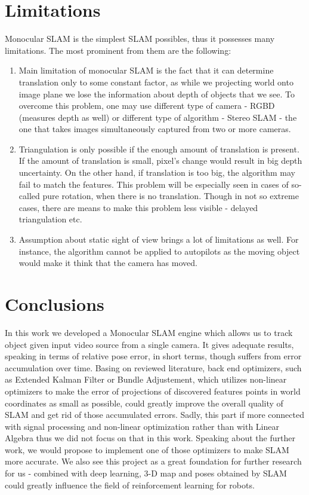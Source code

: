 \pagebreak
\section{Limitations}

Monocular SLAM is the simplest SLAM possibles, thus it possesses many limitations. The most prominent from them are the following:

\begin{enumerate}
    \item Main limitation of monocular SLAM is the fact that it can determine translation only to some constant factor, as while we projecting world onto image plane we lose the information about depth of objects that we see. To overcome this problem, one may use different type of camera - RGBD (measures depth as well) or different type of algorithm - Stereo SLAM - the one that takes images simultaneously captured from two or more cameras. 
    \item Triangulation is only possible if the enough amount of translation is present. If the amount of translation is small, pixel's change would result in big depth uncertainty. On the other hand, if translation is too big, the algorithm may fail to match the features. This problem will be especially seen in cases of so-called pure rotation, when there is no translation. Though in not so extreme cases, there are means to make this problem less visible - delayed triangulation etc.
    \item Assumption about static sight of view brings a lot of limitations as well.  For instance, the algorithm cannot be applied to autopilots as the moving object would make it think that the camera has moved. 
\end{enumerate}

\section{Conclusions}
In this work we developed a Monocular SLAM engine which allows us to track object given input video source from a single camera. It gives adequate results, speaking in terms of relative pose error, in short terms, though suffers from error accumulation over time. Basing on reviewed literature, back end optimizers, such as Extended Kalman Filter or Bundle Adjustement, which utilizes non-linear optimizers to make the error of projections of discovered features points in world coordinates as small as possible, could greatly improve the overall quality of SLAM and get rid of those accumulated errors. Sadly, this part if more connected with signal processing and non-linear optimization rather than with Linear Algebra thus we did not focus on that in this work. Speaking about the further work, we would propose to implement one of those optimizers to make SLAM more accurate. We also see this project as a great foundation for further research for us - combined with deep learning, 3-D map and poses obtained by SLAM could greatly influence the field of reinforcement learning for robots. 


